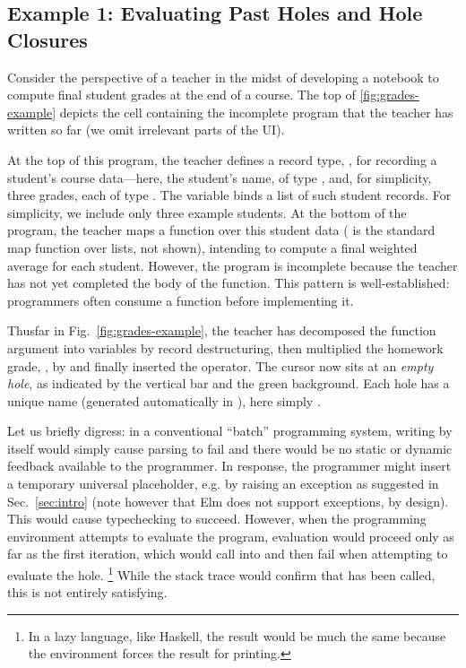 
\subsection{Example 1: Evaluating Past Holes and Hole Closures}

Consider the perspective of a teacher in the midst of developing a \Hazel{} notebook
to compute final student grades at the end of a course.
The top of \autoref{fig:grades-example} depicts the cell containing the incomplete program that 
the teacher has written so far (we omit irrelevant parts of the UI). 
%

At the top of this program, the teacher defines a
record type, , for recording a student's course data---here,
the student's name, of type
, and, for simplicity, three grades, each of type . The variable  binds a list of such student records. For simplicity, we include only three example students.
At the bottom of the program, the teacher maps a function  over this student data ( is the standard map function over lists, not shown), intending to compute a final weighted average for each student.
However, the program is incomplete because the teacher has not yet completed the body of the  function. This pattern is well-established: programmers often consume a function before implementing it.

Thusfar in Fig.~\ref{fig:grades-example}, the teacher has decomposed the function argument into variables by record destructuring, then multiplied the homework grade, , by  and finally inserted the \li{+} operator. The cursor now sits at an \emph{empty hole}, as indicated by the vertical bar and the green background. Each hole has a unique name (generated automatically in \Hazel), here simply . 

Let us briefly digress: in a conventional ``batch'' programming system, writing  by itself would simply cause parsing to fail and there would be no static or dynamic feedback available to the programmer.
In response, the programmer might insert a temporary universal placeholder, e.g. by raising an exception as suggested in Sec.~\ref{sec:intro} (note however that Elm does not support exceptions, by design). This would cause typechecking to succeed. 
However, when the programming environment attempts to evaluate the program, 
evaluation would proceed only as far as the first  iteration, 
which would call into  and then fail when attempting to evaluate the hole.%
\footnote{In a lazy language, like Haskell, the result would be much the same because the environment forces the result for printing.}
While the stack trace would confirm that  has been called, this is not entirely satisfying.

